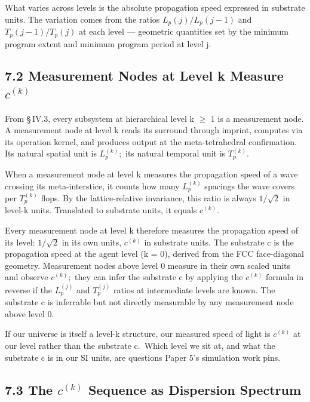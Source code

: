 \documentclass[11pt,oneside]{report}
\theoremstyle{definition}
\theoremstyle{remark}
\begin{document}
What varies across levels is the absolute propagation speed expressed in
substrate units. The variation comes from the ratios \ensuremath{L_{p}(j)/L_{p}(j-1)}
and \ensuremath{T_{p}(j-1)/T_{p}(j)} at each level --- geometric quantities set by the
minimum program extent and minimum program period at level j.

\subsection*{7.2 Measurement Nodes at Level k Measure \ensuremath{c^{(k)}}}

From \S\,IV.3, every subsystem at hierarchical level k \ensuremath{\geq} 1 is a measurement
node. A measurement node at level k reads its surround through imprint,
computes via its operation kernel, and produces output at the
meta-tetrahedral confirmation. Its natural spatial unit is \ensuremath{L_{p}^{(k)};}
its natural temporal unit is \ensuremath{T_{p}^{(k)}.}

When a measurement node at level k measures the propagation speed of a
wave crossing its meta-interstice, it counts how many \ensuremath{L_{p}^{(k)}}
spacings the wave covers per \ensuremath{T_{p}^{(k)}} flops. By the lattice-relative
invariance, this ratio is always \ensuremath{1/\sqrt{2}} in level-k units. Translated to
substrate units, it equals \ensuremath{c^{(k)}.}

Every measurement node at level k therefore measures the propagation
speed of its level: \ensuremath{1/\sqrt{2}} in its own units, \ensuremath{c^{(k)}} in substrate units.
The substrate c is the propagation speed at the agent level (k = 0),
derived from the FCC face-diagonal geometry. Measurement nodes above
level 0 measure in their own scaled units and observe \ensuremath{c^{(k)};} they can
infer the substrate c by applying the \ensuremath{c^{(k)}} formula in reverse if the
\ensuremath{L_{p}^{(j)}} and \ensuremath{T_{p}^{(j)}} ratios at intermediate levels are known. The
substrate c is inferrable but not directly measurable by any measurement
node above level 0.

If our universe is itself a level-k structure, our measured speed of
light is \ensuremath{c^{(k)}} at our level rather than the substrate c.~Which level
we sit at, and what the substrate c is in our SI units, are questions
Paper 5's simulation work pins.

\subsection*{7.3 The \ensuremath{c^{(k)}} Sequence as Dispersion Spectrum}
\end{document}
